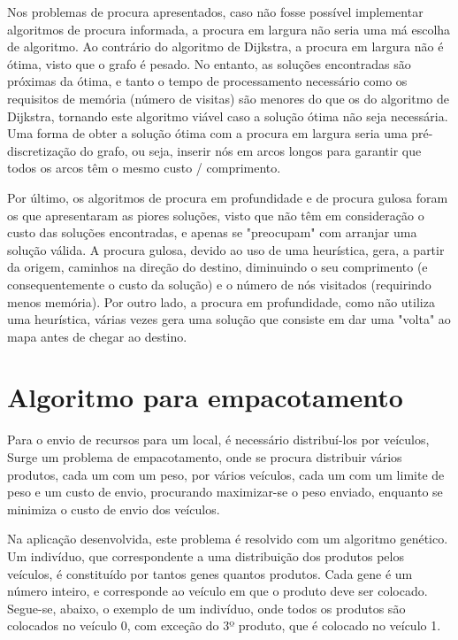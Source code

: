 \documentclass[12pt, a4paper]{article}
\begin{document}
Nos problemas de procura apresentados, caso não fosse possível implementar algoritmos de procura
informada, a procura em largura não seria uma má escolha de algoritmo. Ao contrário do algoritmo de
Dijkstra, a procura em largura não é ótima, visto que o grafo é pesado. No entanto, as soluções
encontradas são próximas da ótima, e tanto o tempo de processamento necessário como os requisitos de
memória (número de visitas) são menores do que os do algoritmo de Dijkstra, tornando este algoritmo
viável caso a solução ótima não seja necessária. Uma forma de obter a solução ótima com a procura em
largura seria uma pré-discretização do grafo, ou seja, inserir nós em arcos longos para garantir que
todos os arcos têm o mesmo custo / comprimento.

Por último, os algoritmos de procura em profundidade e de procura gulosa foram os que apresentaram
as piores soluções, visto que não têm em consideração o custo das soluções encontradas, e apenas se
"preocupam"{} com arranjar uma solução válida. A procura gulosa, devido ao uso de uma heurística,
gera, a partir da origem, caminhos na direção do destino, diminuindo o seu comprimento (e
consequentemente o custo da solução) e o número de nós visitados (requirindo menos memória). Por
outro lado, a procura em profundidade, como não utiliza uma heurística, várias vezes gera uma
solução que consiste em dar uma "volta"{} ao mapa antes de chegar ao destino.

\section{Algoritmo para empacotamento}

Para o envio de recursos para um local, é necessário distribuí-los por veículos, Surge um problema
de empacotamento, onde se procura distribuir vários produtos, cada um com um peso, por vários
veículos, cada um com um limite de peso e um custo de envio, procurando maximizar-se o peso enviado,
enquanto se minimiza o custo de envio dos veículos.

Na aplicação desenvolvida, este problema é resolvido com um algoritmo genético. Um indivíduo, que
correspondente a uma distribuição dos produtos pelos veículos, é constituído por tantos genes
quantos produtos. Cada gene é um número inteiro, e corresponde ao veículo em que o produto deve ser
colocado. Segue-se, abaixo, o exemplo de um indivíduo, onde todos os produtos são colocados no
veículo 0, com exceção do 3º produto, que é colocado no veículo 1.
\end{document}
